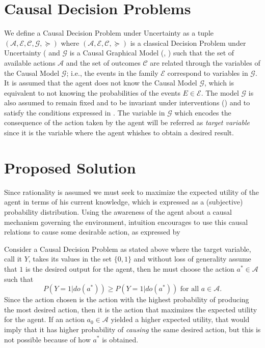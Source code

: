 \documentclass[letterpaper]{article} %
\begin{document}
\section{Causal Decision Problems}
We define a Causal Decision Problem under Uncertainty as a tuple $(\mathcal{A}, \mathcal{E}, \mathcal{C}, \mathcal{G}, \succeq)$ where  $(\mathcal{A}, \mathcal{E}, \mathcal{C}, \succeq)$ is a classical Decision Problem under Uncertainty (\cite{bernardo2000bayesian} and $\mathcal{G}$ is a Causal Graphical Model (\cite{koller2009probabilistic}, \cite{sucar2015probabilistic}) such that the set of available actions $\mathcal{A}$ and the set of outcomes $\mathcal{C}$ are related through the variables of the Causal Model $\mathcal{G}$; i.e., the events in the family $\mathcal{E}$ correspond to variables in $\mathcal{G}$. It is assumed that the agent does not know the Causal Model $\mathcal{G}$, which is equivalent to not knowing the probabilities of the events $E \in \mathcal{E}$. The model $\mathcal{G}$ is also assumed to remain fixed and to be invariant under interventions (\cite{woodward2005making}) and to satisfy the conditions expressed in \cite{spirtes2000causation}. The variable in $\mathcal{G}$ which encodes the consequence of the action taken by the agent will be referred as \textit{target variable} since it is the variable where the agent whishes to obtain a desired result. 
\section{Proposed Solution}
Since rationality is assumed we must seek to maximize the expected utility of the agent in terms of his current knowledge, which is expressed as a (subjective) probability distribution. Using the awareness of the agent about a causal mechanism governing the environment, intuition encourages to use this causal relations to cause some desirable action, as expressed by \cite{joyce1999foundations}

Consider a Causal Decision Problem as stated above where the target variable, call it $Y$, takes its values in the set $\{0,1\}$ and without loss of generality assume that $1$ is the desired output for the agent, then he must choose the action $a^\ast \in \mathcal{A}$ such that
\[ P(Y=1 | do(a^\ast)) \geq P(Y=1 | do(a^\ast)) \textrm{ for all } a \in \mathcal{A}. \]
Since the action chosen is the action with the highest probability of producing the most desired action, then it is the action that maximizes the expected utility for the agent. If an action $a_0 \in \mathcal{A}$ yielded a higher expected utility, that would imply that it has higher probability of \textit{causing} the same desired action, but this is not possible because of how $a^\ast$ is obtained.
\end{document}
